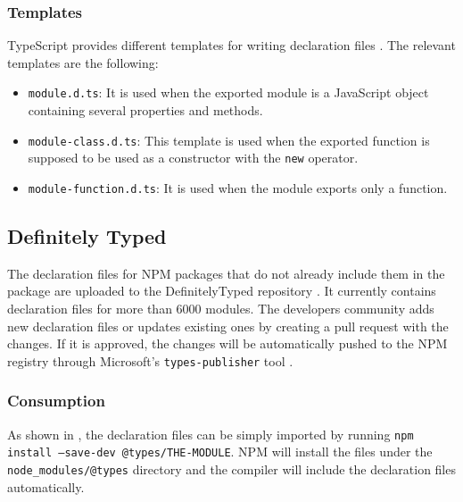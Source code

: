 \subsubsection{Templates}
TypeScript provides different templates for writing declaration files \citep{typescript-declaration-files-templates}. The relevant templates are the following:
\begin{itemize}
	\item \texttt{module.d.ts}: It is used when the exported module is a JavaScript object containing several properties and methods.
  
	\item \texttt{module-class.d.ts}: This template is used when the exported function is supposed to be used as a constructor with the \texttt{new} operator.
	
	\item \texttt{module-function.d.ts}: It is used when the module exports only a function.
  \end{itemize}

\subsection{Definitely Typed}
The declaration files for NPM packages that do not already include them in the package are uploaded to the DefinitelyTyped repository \citep{definitely-typed-repository}. It currently contains declaration files for more than 6000 modules. The developers community adds new declaration files or updates existing ones by creating a pull request with the changes. If it is approved, the changes will be automatically pushed to the NPM registry through Microsoft's \texttt{types-publisher} tool \citep{types-publisher}.

\subsubsection{Consumption}
As shown in , the declaration files can be simply imported by running \texttt{npm install --save-dev @types/THE-MODULE}. NPM will install the files under the \texttt{node_modules/@types} directory and the compiler will include the declaration files automatically.

